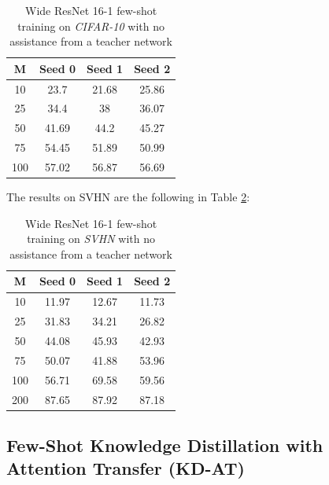\begin{table}[!h]
    \centering
    \begin{tabular}{c|ccc}
    \toprule
    \toprule
         \textbf{M} & \textbf{Seed 0} & \textbf{Seed 1} & \textbf{Seed 2} \\
         \midrule
         10 & 23.7   & 21.68  & 25.86 \\
         25 & 34.4   & 38     & 36.07 \\
         50 & 41.69  & 44.2   & 45.27  \\
         75 & 54.45  & 51.89  & 50.99  \\
         100 & 57.02 & 56.87 & 56.69 \\
         \bottomrule
         \bottomrule
    \end{tabular}
    \vspace{0.25cm}
    \caption{Wide ResNet 16-1 few-shot training on \textit{CIFAR-10} with no assistance from a teacher network}
    \label{tab:few_show_cifar10_noteacher}

\end{table}

\newpage
The results on SVHN are the following in Table \ref{tab:few_show_svhn_noteacher}:

\begin{table}[!h]
    \centering
    \begin{tabular}{c|ccc}
    \toprule
    \toprule
         \textbf{M} & \textbf{Seed 0} & \textbf{Seed 1} & \textbf{Seed 2} \\
         \midrule
         10 & 11.97 & 12.67 & 11.73\\
         25 & 31.83 & 34.21 &  26.82\\
         50 & 44.08 & 45.93 & 42.93 \\
         75 & 50.07 & 41.88 & 53.96 \\
         100 & 56.71 & 69.58 & 59.56 \\
         200 & 87.65 & 87.92 & 87.18\\
         \bottomrule
         \bottomrule
    \end{tabular}
    \vspace{0.25cm}
    \caption{Wide ResNet 16-1 few-shot training on \textit{SVHN} with no assistance from a teacher network}
    \label{tab:few_show_svhn_noteacher}

\end{table}

\subsection{Few-Shot Knowledge Distillation with Attention Transfer (KD-AT)}

